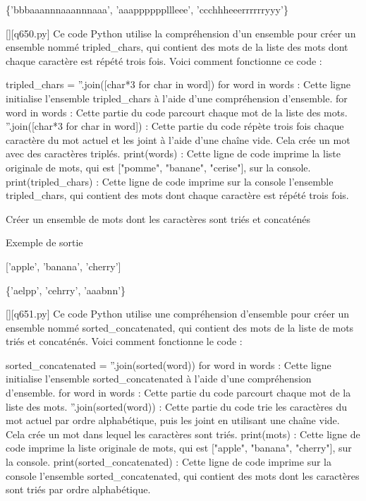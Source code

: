 \{'bbbaaannnaaannnaaa', 'aaappppppllleee', 'ccchhheeerrrrrryyy'\}
        \par
        \begin{solution}
            \renewcommand{\nomfichier}{q650.py}
            \pythonfile{\chemincode \nomfichier}[][\nomfichier]
            Ce code Python utilise la compréhension d'un ensemble pour créer un ensemble nommé tripled_chars, qui contient des mots de la liste des mots dont chaque caractère est répété trois fois. Voici comment fonctionne ce code :

    tripled_chars = {''.join([char*3 for char in word]) for word in words} : Cette ligne initialise l'ensemble tripled_chars à l'aide d'une compréhension d'ensemble.
        for word in words : Cette partie du code parcourt chaque mot de la liste des mots.
        ''.join([char*3 for char in word]) : Cette partie du code répète trois fois chaque caractère du mot actuel et les joint à l'aide d'une chaîne vide. Cela crée un mot avec des caractères triplés.
    print(words) : Cette ligne de code imprime la liste originale de mots, qui est ["pomme", "banane", "cerise"], sur la console.
    print(tripled_chars) : Cette ligne de code imprime sur la console l'ensemble tripled_chars, qui contient des mots dont chaque caractère est répété trois fois.
        \end{solution}
        

        \question
        Créer un ensemble de mots dont les caractères sont triés et concaténés

Exemple de sortie

['apple', 'banana', 'cherry']

\{'aelpp', 'cehrry', 'aaabnn'\}
        \par
        \begin{solution}
            \renewcommand{\nomfichier}{q651.py}
            \pythonfile{\chemincode \nomfichier}[][\nomfichier]
            Ce code Python utilise une compréhension d'ensemble pour créer un ensemble nommé sorted_concatenated, qui contient des mots de la liste de mots triés et concaténés. Voici comment fonctionne le code :

    sorted_concatenated = {''.join(sorted(word)) for word in words} : Cette ligne initialise l'ensemble sorted_concatenated à l'aide d'une compréhension d'ensemble.
        for word in words : Cette partie du code parcourt chaque mot de la liste des mots.
        ''.join(sorted(word)) : Cette partie du code trie les caractères du mot actuel par ordre alphabétique, puis les joint en utilisant une chaîne vide. Cela crée un mot dans lequel les caractères sont triés.
    print(mots) : Cette ligne de code imprime la liste originale de mots, qui est ["apple", "banana", "cherry"], sur la console.
    print(sorted_concatenated) : Cette ligne de code imprime sur la console l'ensemble sorted_concatenated, qui contient des mots dont les caractères sont triés par ordre alphabétique.
        \end{solution}
        

